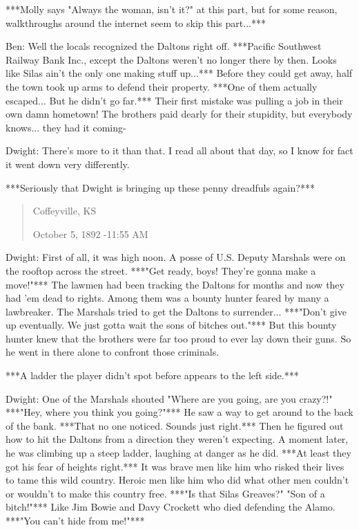 \documentclass{article}
\begin{document}
***Molly says "Always the woman, isn't it?" at this part, but for some reason, walkthroughs around the internet seem to skip this part...***

Ben: Well the locals recognized the Daltons right off. ***Pacific Southwest Railway Bank Inc., except the Daltons weren't no longer there by then. Looks like Silas ain't the only one making stuff up...*** Before they could get away, half the town took up arms to defend their property. ***One of them actually escaped... But he didn't go far.*** Their first mistake was pulling a job in their own damn hometown! The brothers paid dearly for their stupidity, but everybody knows... they had it coming-

Dwight: There's more to it than that. I read all about that day, so I know for fact it went down very differently.

***Seriously that Dwight is bringing up these penny dreadfuls again?***

\begin{quote}
    Coffeyville, KS
    
    October 5, 1892 -11:55 AM
\end{quote}

Dwight: First of all, it was high noon. A posse of U.S. Deputy Marshals were on the rooftop across the street. ***"Get ready, boys! They're gonna make a move!"*** The lawmen had been tracking the Daltons for months and now they had 'em dead to rights. Among them was a bounty hunter feared by many a lawbreaker. The Marshals tried to get the Daltons to surrender... ***"Don't give up eventually. We just gotta wait the sons of bitches out."*** But this bounty hunter knew that the brothers were far too proud to ever lay down their guns. So he went in there alone to confront those criminals.

***A ladder the player didn't spot before appears to the left side.***

Dwight: One of the Marshals shouted "Where are you going, are you crazy?!" ***"Hey, where you think you going?"*** He saw a way to get around to the back of the bank. ***That no one noticed. Sounds just right.*** Then he figured out how to hit the Daltons from a direction they weren't expecting. A moment later, he was climbing up a steep ladder, laughing at danger as he did. ***At least they got his fear of heights right.*** It was brave men like him who risked their lives to tame this wild country. Heroic men like him who did what other men couldn't or wouldn't to make this country free. ***"Is that Silas Greaves?" "Son of a bitch!"*** Like Jim Bowie and Davy Crockett who died defending the Alamo. ***"You can't hide from me!"***
\end{document}
